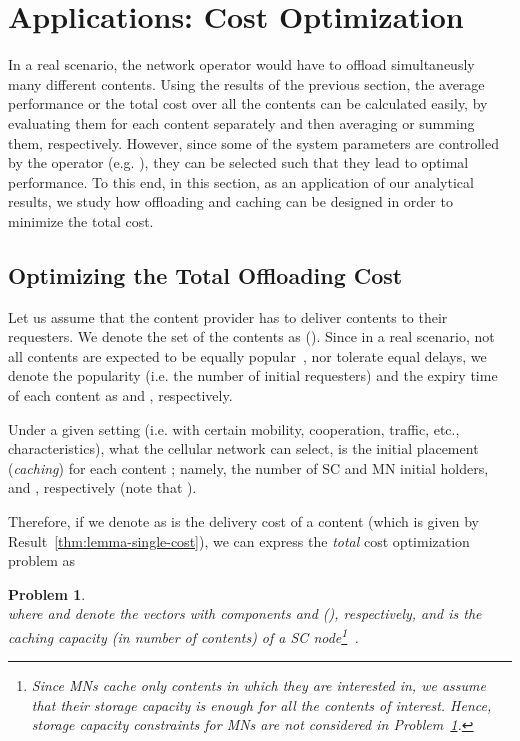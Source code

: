 \documentclass[10pt,conference,letterpaper]{IEEEtran}
\newtheorem{problem}{Problem}
\begin{document}
\section{Applications: Cost Optimization}\label{sec:single-cost-optimization}
In a real scenario, the network operator would have to offload simultaneusly many different contents. Using the results of the previous section, the average performance or the total cost over all the contents can be calculated easily, by evaluating them for each content separately and then averaging or summing them, respectively. However, since some of the system parameters are controlled by the operator (e.g. ), they can be selected such that they lead to optimal performance. To this end, in this section, as an application of our analytical results, we study how offloading and caching can be designed in order to minimize the total cost.


\subsection{Optimizing the Total Offloading Cost}\label{sec:optimizing-total-cost}
Let us assume that the content provider has to deliver  contents to their requesters. We denote the set of the contents as  ().  Since in a real scenario, not all contents are expected to be equally popular~\cite{youtube-traffic-from-edge,top-video-cellular,pptv-mobile-vod}, nor tolerate equal delays, we denote the popularity (i.e. the number of initial requesters) and the expiry time of each content  as  and , respectively.

Under a given setting (i.e. with certain mobility, cooperation, traffic, etc., characteristics), what the cellular network can select, is the initial placement (\textit{caching}) for each content ; namely, the number of SC and MN initial holders,  and , respectively (note that ).

Therefore, if we denote as  is the delivery cost of a content  (which is given by Result~\ref{thm:lemma-single-cost}), we can express the \textit{total} cost optimization problem as
\begin{problem}\label{eq:optimization-problem-multi}~\\


where  and  denote the vectors with components  and  (), respectively, and  is the caching capacity (in number of contents) of a SC node\footnote{Since MNs cache only contents in which they are interested in, we assume that their storage capacity is enough for all the contents of interest. Hence, storage capacity constraints for MNs are not considered in Problem~\ref{eq:optimization-problem-multi}.}~.\end{problem}
\end{document}

